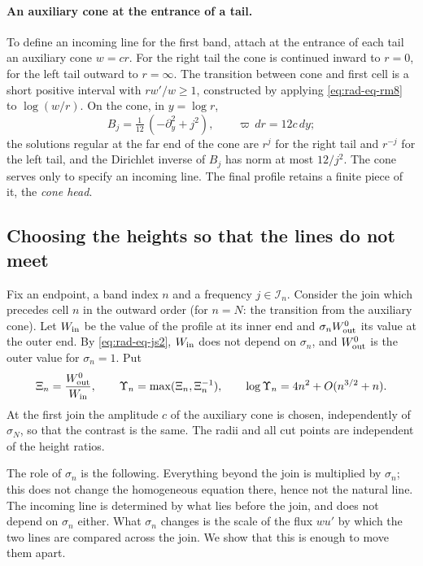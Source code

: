 \paragraph{An auxiliary cone at the entrance of a tail.}
To define an incoming line for the first band, attach at the entrance
of each tail an auxiliary cone $w=cr$. For the right tail the cone is
continued inward to $r=0$, for the left tail outward to $r=\infty$.
The transition between cone and first cell is a short positive
interval with $rw'/w\ge1$, constructed by applying
\eqref{eq:rad-eq-rm8} to $\log(w/r)$. On the cone, in $y=\log r$,
\[
 B_j=\tfrac1{12}\,(-\partial_y^2+j^2),\qquad
 \varpi\,dr=12c\,dy ;
\]
the solutions regular at the far end of the cone are $r^{j}$ for the
right tail and $r^{-j}$ for the left tail, and the Dirichlet inverse
of $B_j$ has norm at most $12/j^2$. The cone serves only to specify
an incoming line. The final profile retains a finite piece of it, the
\emph{cone head}.

\subsection{Choosing the heights so that the lines do not meet}
\label{subsec:height-selection}

Fix an endpoint, a band index $n$ and a frequency
$j\in\mathcal I_n$. Consider the join which precedes cell $n$ in the
outward order (for $n=N$: the transition from the auxiliary cone).
Let $W_{\rm in}$ be the value of the profile at its inner end and
$\sigma_nW^0_{\rm out}$ its value at the outer end. By
\eqref{eq:rad-eq-js2}, $W_{\rm in}$ does not depend on $\sigma_n$,
and $W^0_{\rm out}$ is the outer value for $\sigma_n=1$. Put
\begin{equation}\label{eq:rad-eq-js4}
 \Xi_n=\frac{W^0_{\rm out}}{W_{\rm in}},\qquad
 \Upsilon_n=\max(\Xi_n,\Xi_n^{-1}),\qquad
 \log\Upsilon_n=4n^2+O(n^{3/2}+n).
\end{equation}
At the first join the amplitude $c$ of the auxiliary cone is chosen,
independently of $\sigma_N$, so that the contrast is the same. The
radii and all cut points are independent of the height ratios.

The role of $\sigma_n$ is the following. Everything beyond the join is
multiplied by $\sigma_n$; this does not change the homogeneous
equation there, hence not the natural line. The incoming line is
determined by what lies before the join, and does not depend on
$\sigma_n$ either. What $\sigma_n$ changes is the scale of the flux
$wu'$ by which the two lines are compared across the join. We show
that this is enough to move them apart.

